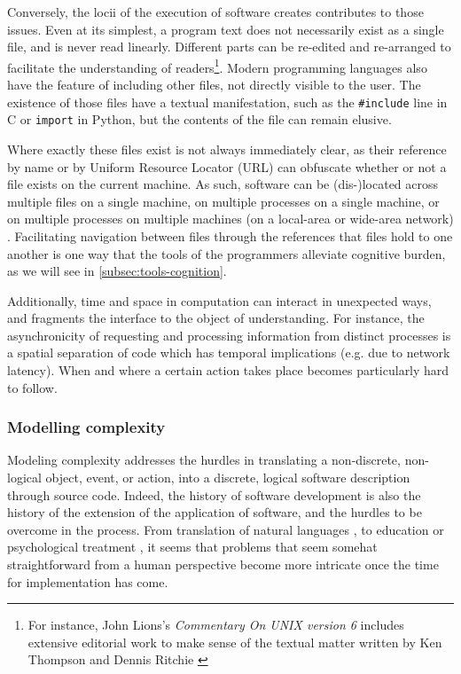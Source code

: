 Conversely, the locii of the execution of software creates contributes to those issues. Even at its simplest, a program text does not necessarily exist as a single file, and is never read linearly. Different parts can be re-edited and re-arranged to facilitate the understanding of readers\footnote{For instance, John Lions's \emph{Commentary On UNIX version 6} includes extensive editorial work to make sense of the textual matter written by Ken Thompson and Dennis Ritchie \citep{lions_lions_1996}}. Modern programming languages also have the feature of including other files, not directly visible to the user. The existence of those files have a textual manifestation, such as the \lstinline{#include} line in C or \lstinline{import} in Python, but the contents of the file can remain elusive.

Where exactly these files exist is not always immediately clear, as their reference by name or by Uniform Resource Locator (URL) can obfuscate whether or not a file exists on the current machine. As such, software can be (dis-)located across multiple files on a single machine, on multiple processes on a single machine, or on multiple processes on multiple machines (on a local-area or wide-area network) \citep{berry_philosophy_2011}. Facilitating navigation between files through the references that files hold to one another is one way that the tools of the programmers alleviate cognitive burden, as we will see in \ref{subsec:tools-cognition}.

Additionally, time and space in computation can interact in unexpected ways, and fragments the interface to the object of understanding. For instance, the asynchronicity of requesting and processing information from distinct processes is a spatial separation of code which has temporal implications (e.g. due to network latency). When and where a certain action takes place becomes particularly hard to follow.

\subsubsection{Modelling complexity}
\label{subsubsec:modelling-complexity}

Modeling complexity addresses the hurdles in translating a non-discrete, non-logical object, event, or action, into a discrete, logical software description through source code. Indeed, the history of software development is also the history of the extension of the application of software, and the hurdles to be overcome in the process. From translation of natural languages \citep{poibeau_machine_2017}, to education \citep{watters_teaching_2021} or psychological treatment \citep{weizenbaum_computer_1976}, it seems that problems that seem somehat straightforward from a human perspective become more intricate once the time for implementation has come.

